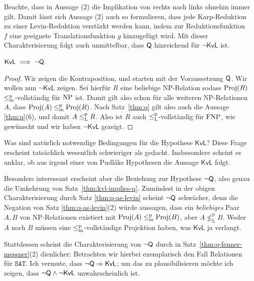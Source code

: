 Beachte, dass in Aussage (2) die Implikation von rechts nach links ohnehin immer gilt. 
Damit lässt sich Aussage (2) auch so formulieren, dass jede Karp-Reduktion zu einer Levin-Reduktion verstärkt werden kann, indem zur Reduktionsfunktion $f$ eine geeignete Translationsfunktion $g$ hinzugefügt wird.
Mit dieser Charakterisierung folgt auch unmittelbar, dass $\mathsf{Q}$ hinreichend für $\neg\mathsf{KvL}$ ist.


\begin{theorem}\label{thm:kvl-implies-q}
    $\mathsf{KvL} \implies \neg\mathsf{Q}$.
\end{theorem}
\begin{proof}
    Wir zeigen die Kontraposition, und starten mit der Voraussetzung $\mathsf{Q}$.
    Wir wollen nun $\neg\mathsf{KvL}$ zeigen. Sei hierfür $R$ eine beliebige NP-Relation sodass $\operatorname{Proj}(R)$ $\leq_\mathrm{m}^\mathrm{p}$-vollständig für $\mathrm{NP}$ ist.
    Damit gilt also schon für alle weiteren NP-Relationen $A$, dass $\operatorname{Proj}(A)\leq_\mathrm{m}^\mathrm{p}\operatorname{Proj}(R)$.
    Nach Satz~\ref{thm:q} gilt also auch die Aussage \ref{thm:q}(6), und damit $A\leq_\mathrm{L}^\mathrm{p} R$. Also ist $R$ auch $\leq_\mathrm{L}^\mathrm{p}$-vollständig für $\mathrm{FNP}$, wie gewünscht und wir haben $\neg\mathsf{KvL}$ gezeigt.
\end{proof}

Was sind natürlich notwendige Bedingungen für die Hypothese $\mathsf{KvL}$? Diese Frage erscheint tatsächlich wesentlich schwieriger als gedacht. Insbesondere scheint es unklar, ob aus irgend einer von Pudláks Hypothesen die Aussage $\mathsf{KvL}$ folgt.

Besonders interessant erscheint aber die Beziehung zur Hypothese $\neg\mathsf{Q}$, also genau die Umkehrung von Satz~\ref{thm:kvl-implies-q}.
Zumindest in der obigen Charakterisierung durch Satz \ref{thm:q-as-levin} scheint $\neg\mathsf{Q}$ schwächer, denn die Negation von Satz \ref{thm:q-as-levin}(2) würde aussagen, dass ein \emph{beliebiges} Paar $A,B$ von NP-Relationen existiert mit $\operatorname{Proj}(A)\leq_\mathrm{m}^\mathrm{p} \operatorname{Proj}(B)$, aber $A \not\leq_\mathrm L^\mathrm p B$. Weder $A$ noch $B$ müssen eine $\leq_\mathrm{m}^\mathrm{p}$-vollständige Projektion haben, was $\mathsf{KvL}$ ja verlangt.

Stattdessen scheint die Charakterisierung von $\neg\mathsf{Q}$ durch \citeauthor{fenner_inverting_2003} in Satz~\ref{thm:q-fenner-messner}(2) dienlicher:
Betrachten wir hierbei exemplarisch den Fall Relationen für $\mathtt{SAT}$. Ich vermute, dass $\neg\mathsf{Q}\Rightarrow \mathsf{KvL}$; um das zu plausibilisieren möchte ich zeigen, dass $\neg\mathsf{Q}\land\neg\mathsf{KvL}$ unwahrscheinlich ist.

